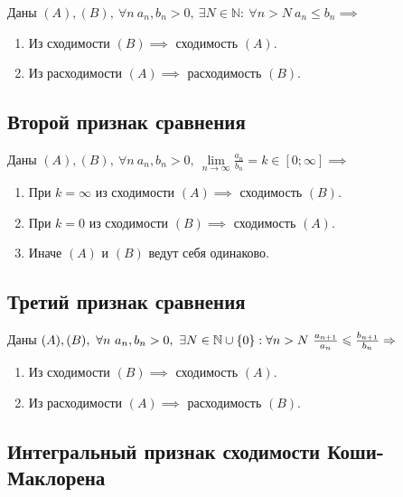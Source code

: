 \begin{theorem}\label{theorem:6.2}
    Даны $ (A),(B), \ \forall n \ a_n, b_n > 0, \ \exists N \in \mathbb{N}: \ \forall n > N \ a_n \leqslant b_n \implies $
    \begin{enumerate}
        \item Из сходимости $(B) \implies$ сходимость $(A)$.
        \item Из расходимости $(A) \implies$ расходимость $(B)$.
    \end{enumerate}
\end{theorem}

\newpage

\subsection{Второй признак сравнения}

\begin{theorem}
    Даны $ (A),(B), \ \forall n \ a_n, b_n > 0, \ \underset{n\rightarrow\infty}{\lim}\frac{a_n}{b_n}=k \in [0;\infty] \implies $
    \begin{enumerate}
        \item При $k=\infty$ из сходимости $(A) \implies$ сходимость $(B)$.
        \item При $k=0$ из сходимости $(B) \implies$ сходимость $(A)$.
        \item Иначе $(A)$ и $(B)$ ведут себя одинаково.
    \end{enumerate}
\end{theorem}

\subsection{Третий признак сравнения}

\begin{theorem}
    Даны $ (A),(B), \ \forall n \ a_n, b_n > 0, \ \exists N \in \N \cup \{0\}: \forall n > N \ \frac{a_{n+1}}{a_n}\leqslant\frac{b_{n+1}}{b_n} \implies$
    \begin{enumerate}
        \item Из сходимости $(B) \implies$ сходимость $(A)$.
        \item Из расходимости $(A) \implies$ расходимость $(B)$.
    \end{enumerate}
\end{theorem}

\subsection{Интегральный признак сходимости Коши-Маклорена}

